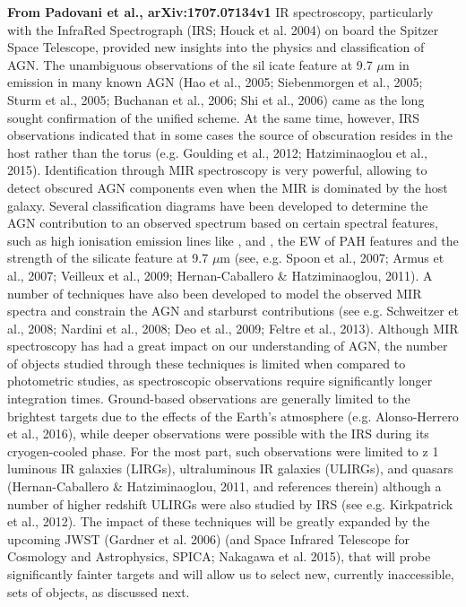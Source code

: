 {\bf From Padovani et al.,  arXiv:1707.07134v1}
IR spectroscopy, particularly with the InfraRed Spectrograph (IRS;
Houck et al. 2004) on board the Spitzer Space Telescope, provided new
insights into the physics and classification of AGN. The unambiguous
observations of the sil icate feature at 9.7 $\mu$m in emission in many
known AGN (Hao et al., 2005; Siebenmorgen et al., 2005; Sturm et al.,
2005; Buchanan et al., 2006; Shi et al., 2006) came as the long sought
confirmation of the unified scheme. At the same time, however, IRS
observations indicated that in some cases the source of obscuration
resides in the host rather than the torus (e.g. Goulding et al., 2012;
Hatziminaoglou et al., 2015).  Identification through MIR spectroscopy
is very powerful, allowing to detect obscured AGN components even
when the MIR is dominated by the host galaxy. Several classification
diagrams have been developed to determine the AGN contribution to an
observed spectrum based on certain spectral features, such as high
ionisation emission lines like \nev, \neii and \oiv, the EW of
PAH features and the strength of the silicate feature at 9.7 $\mu$m (see,
e.g. Spoon et al., 2007; Armus et al., 2007;
Veilleux et al., 2009; Hernan-Caballero \& Hatziminaoglou, 2011). A
number of techniques have also been developed to model the observed
MIR spectra and constrain the AGN and starburst contributions (see
e.g. Schweitzer et al., 2008; Nardini et al., 2008; Deo et al., 2009;
Feltre et al., 2013).  Although MIR spectroscopy has had a great
impact on our understanding of AGN, the number of objects studied
through these techniques is limited when compared to photometric
studies, as spectroscopic observations require significantly longer
integration times. Ground-based observations are generally limited
to the brightest targets due to the effects of the Earth's atmosphere
(e.g. Alonso-Herrero et al., 2016), while deeper observations were
possible with the IRS during its cryogen-cooled phase. For the most
part, such observations were limited to z 1 luminous IR galaxies
(LIRGs), ultraluminous IR galaxies (ULIRGs), and quasars (Hernan-Caballero \& Hatziminaoglou, 2011, and references therein) although a
number of higher redshift ULIRGs were also studied by IRS (see
e.g. Kirkpatrick et al., 2012). The impact of these techniques will be
greatly expanded by the upcoming JWST (Gardner et al. 2006) 
(and Space Infrared Telescope for Cosmology and Astrophysics, SPICA; Nakagawa
et al. 2015), 
that will probe significantly fainter targets and will
allow us to select new, currently inaccessible, sets of objects, as
discussed next.


